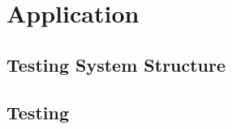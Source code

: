 \documentclass[10pt,a4paper,titlepage]{article}
\begin{document}
    
    \section{Application}
        
        \subsection{Testing System Structure}


        \subsection{Testing}
    
    \newpage
    \printbibliography
    
    
\end{document}
